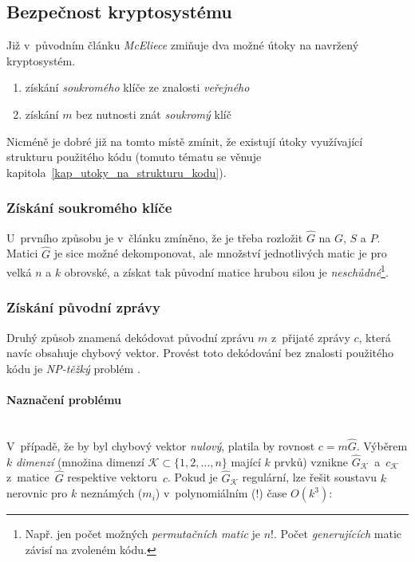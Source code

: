 \documentclass[thesis=M,czech,hidelinks]{FITthesis}[2012/06/26]
\newcommand{\0}{{\textcolor[gray]{0.80}{0}}}
\begin{document}
\subsection{Bezpečnost kryptosystému}\label{kap_bezpecnost}
Již v~původním článku \cite{McEliece} \emph{McEliece} zmiňuje dva možné útoky na
navržený kryptosystém.
\begin{enumerate}
    \item získání \emph{soukromého} klíče ze znalosti \emph{veřejného}
    \item získání $m$ bez nutnosti znát \emph{soukromý} klíč
\end{enumerate}

Nicméně je dobré již na tomto místě zmínit, že existují útoky využívající
strukturu použitého kódu (tomuto tématu se věnuje
kapitola~\ref{kap_utoky_na_strukturu_kodu}).

\subsubsection{Získání soukromého klíče}
U~prvního způsobu je v~článku zmíněno, že je třeba rozložit $\hat{G}$ na $G$,
$S$ a $P$.  Matici $\hat{G}$ je sice možné dekomponovat, ale množství
jednotlivých matic je pro velká $n$ a $k$ obrovské, a získat tak původní matice
hrubou silou je \emph{neschůdné}\footnote{
    Např. jen počet možných \emph{permutačních matic} je $n!$. Počet
    \emph{generujících} matic závisí na zvoleném kódu.
}.


\subsubsection{Získání původní zprávy}
Druhý způsob znamená dekódovat původní zprávu $m$ z~přijaté zprávy $c$,
která navíc obsahuje chybový vektor. Provést toto dekódování bez znalosti
použitého kódu je \emph{NP-těžký} problém \cite{Berlekamp}.

\paragraph{Naznačení problému} \hfil \\
V~případě, že by byl chybový vektor \emph{nulový}, platila by rovnost
$c = m\hat{G}$. Výběrem $k$ \emph{dimenzí} (množina dimenzí
$\mathcal{K} \subset \{1,2,\ldots,n\}$ mající $k$ prvků) vznikne
$\hat{G}_{\mathcal{K}}$~a~$c_{\mathcal{K}}$ z~matice~$\hat{G}$ respektive
vektoru~$c$. Pokud je $\hat{G}_{\mathcal{K}}$ regulární, lze řešit soustavu $k$
nerovnic pro $k$ neznámých ($m_i$) v~polynomiálním (!) čase $O\left(k^3\right)$:
\end{document}
